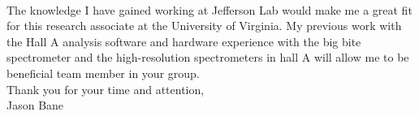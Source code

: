 \documentclass[12pt,letterpaper]{article}
\begin{document}
\paragraph{}The knowledge I have gained working at Jefferson Lab would make me a great fit for this research associate at the University of Virginia. My previous work with the Hall A analysis software and hardware experience with the big bite spectrometer and the high-resolution spectrometers in hall A will allow me to be beneficial team member in your group. \\

\noindent Thank you for your time and attention,\\
\noindent Jason Bane
\newpage
\end{document}
